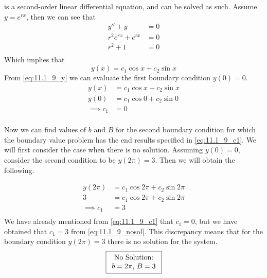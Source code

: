 \documentclass[12pt]{article}
\begin{document}
 is a second-order linear differential equation,
and can be solved as such. Assume $y=e^{rx}$, then we can see that
\begin{equation*}
  \begin{aligned}
    y''+y&=0 \\
    r^2e^{rx}+e^{rx}&=0 \\
    r^2+1&=0 \\
  \end{aligned}
\end{equation*}
Which implies that
\begin{equation}
  \label{eq:11.1_9_y}
  y(x)=c_1\cos x + c_2\sin x
\end{equation}
From \cref{eq:11.1_9_y} we can evaluate the first boundary condition
$y(0)=0$.
\begin{equation}
  \label{eq:11.1_9_c1}
  \begin{aligned}
    y(x)&=c_1\cos x + c_2\sin x \\
    y(0)&=c_1\cos 0 + c_2\sin 0 \\
    \implies c_1&=0 \\
  \end{aligned}
\end{equation}

Now we can find values of $b$ and $B$ for the second boundary
condition for which the boundary value problem has the end results
specified in \cref{eq:11.1_9_c1}. We will first consider the case when
there is no solution. Assuming $y(0)=0$, consider the second condition
to be $y(2\pi)=3$. Then we will obtain the following.

\begin{equation}
  \label{eq:11.1_9_nosol}
  \begin{aligned}
    y(2\pi)&=c_1\cos 2\pi + c_2\sin 2\pi \\
    3&=c_1\cos 2\pi + c_2\sin 2\pi \\
    \implies c_1 &= 3 \\
  \end{aligned}
\end{equation}
We have already mentioned from \cref{eq:11.1_9_c1} that $c_1=0$, but
we have obtained that $c_1=3$ from \cref{eq:11.1_9_nosol}.  This
discrepancy means that for the boundary condition $y(2\pi)=3$ there is
no solution for the system.
\begin{equation*}
\boxed{
  \begin{array}[c]{c}
    \text{No Solution:} \\
    b=2\pi,\,B=3 \\
  \end{array}
}
\end{equation*}
\end{document}
